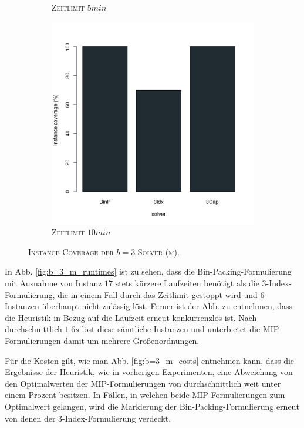 \begin{figure}[H]
\begin{subfigure}[b]{0.3\textwidth}
\caption{\textsc{Zeitlimit} $5min$}
\label{fig:instance_coverage_b=3_m_b}
\end{subfigure}
\hfill
\begin{subfigure}[b]{0.3\textwidth}
\centering
\includegraphics[width=1.2\textwidth]{img/solver_instance_coverage_b=3_m_600s.png}
\caption{\textsc{Zeitlimit} $10min$}
\label{fig:instance_coverage_b=3_m_c}
\end{subfigure}
\caption{\textsc{Instance-Coverage der $b = 3$ Solver (m)}.}
\label{fig:instance_coverage_b=3_m}
\end{figure}

In Abb. \ref{fig:b=3_m_runtimes} ist zu sehen, dass die Bin-Packing-Formulierung mit Ausnahme von Instanz $17$ stets kürzere Laufzeiten
benötigt als die 3-Index-Formulierung, die in einem Fall durch das Zeitlimit gestoppt wird und $6$ Instanzen überhaupt nicht zulässig löst. Ferner ist der Abb. zu entnehmen, dass die Heuristik in Bezug auf die Laufzeit erneut konkurrenzlos ist.
Nach durchschnittlich $1.6s$ löst diese sämtliche Instanzen und unterbietet die MIP-Formulierungen damit um mehrere Größenordnungen.

Für die Kosten gilt, wie man Abb. \ref{fig:b=3_m_costs} entnehmen kann, dass die Ergebnisse der Heuristik,
wie in vorherigen Experimenten, eine Abweichung von den Optimalwerten der MIP-Formulierungen von durchschnittlich
weit unter einem Prozent besitzen. In Fällen, in welchen beide MIP-Formulierungen zum Optimalwert gelangen, wird die Markierung
der Bin-Packing-Formulierung erneut von denen der 3-Index-Formulierung verdeckt.


